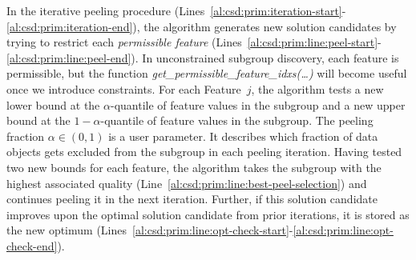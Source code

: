 \documentclass{article}
\theoremstyle{definition}
\begin{document}
In the iterative peeling procedure (Lines~\ref{al:csd:prim:iteration-start}-\ref{al:csd:prim:iteration-end}), the algorithm generates new solution candidates by trying to restrict each \emph{permissible feature} (Lines~\ref{al:csd:prim:line:peel-start}-\ref{al:csd:prim:line:peel-end}).
In unconstrained subgroup discovery, each feature is permissible, but the function \emph{get\_permissible\_feature\_idxs(\dots)} will become useful once we introduce constraints.
For each Feature~$j$, the algorithm tests a new lower bound at the $\alpha$-quantile of feature values in the subgroup and a new upper bound at the $1-\alpha$-quantile of feature values in the subgroup.
The peeling fraction $\alpha \in (0, 1)$ is a user parameter.
It describes which fraction of data objects gets excluded from the subgroup in each peeling iteration.
Having tested two new bounds for each feature, the algorithm takes the subgroup with the highest associated quality (Line~\ref{al:csd:prim:line:best-peel-selection}) and continues peeling it in the next iteration. Further, if this solution candidate improves upon the optimal solution candidate from prior iterations, it is stored as the new optimum (Lines~\ref{al:csd:prim:line:opt-check-start}-\ref{al:csd:prim:line:opt-check-end}).
\end{document}
